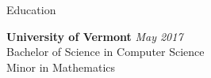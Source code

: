 \documentclass{resume} %
\begin{document}

\begin{rSection}{Education}

{\bf University of Vermont} \hfill {\em May 2017} \\ 
Bachelor of Science in Computer Science \\
Minor in Mathematics
\end{rSection}

\end{document}
